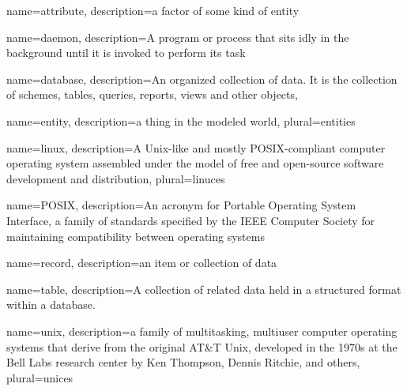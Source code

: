  {
    name=attribute,
    description={a factor of some kind of entity}
}

 {
    name=daemon,
    description={A program or process that sits idly in the background until it is invoked to perform its task}
}

 {
    name=database,
    description={An organized collection of data. It is the collection of schemes, tables, queries, reports, views and other objects},
}

 {
    name=entity,
    description={a thing in the modeled world},
    plural=entities
}


 {
    name=linux,
    description={A Unix-like and mostly POSIX-compliant computer operating system assembled under the model of free and open-source software development and distribution},
    plural=linuces
}


 {
    name=POSIX,
    description={An acronym for Portable Operating System Interface, a family of standards specified by the IEEE Computer Society for maintaining compatibility between operating systems}
}

 {
    name=record,
    description={an item or collection of data}
}

 {
    name=table,
    description={A collection of related data held in a structured format within a database.}
}


 {
    name=unix,
    description={a family of multitasking, multiuser computer operating systems that derive from the original AT\&T Unix, developed in the 1970s at the Bell Labs research center by Ken Thompson, Dennis Ritchie, and others},
    plural=unices    
}


